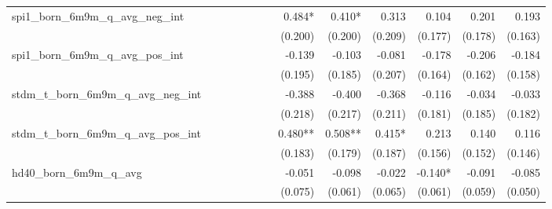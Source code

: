 \begin{tabular}{lrrrrrrrrrrrr}
spi1\_born\_6m9m\_q\_avg\_neg\_int          &              &              &              &              &              &              &       0.484* &       0.410* &        0.313 &        0.104 &        0.201 &        0.193 \\ 
                                            &              &              &              &              &              &              &      (0.200) &      (0.200) &      (0.209) &      (0.177) &      (0.178) &      (0.163) \\ 
spi1\_born\_6m9m\_q\_avg\_pos\_int          &              &              &              &              &              &              &       -0.139 &       -0.103 &       -0.081 &       -0.178 &       -0.206 &       -0.184 \\ 
                                            &              &              &              &              &              &              &      (0.195) &      (0.185) &      (0.207) &      (0.164) &      (0.162) &      (0.158) \\ 
stdm\_t\_born\_6m9m\_q\_avg\_neg\_int       &              &              &              &              &              &              &       -0.388 &       -0.400 &       -0.368 &       -0.116 &       -0.034 &       -0.033 \\ 
                                            &              &              &              &              &              &              &      (0.218) &      (0.217) &      (0.211) &      (0.181) &      (0.185) &      (0.182) \\ 
stdm\_t\_born\_6m9m\_q\_avg\_pos\_int       &              &              &              &              &              &              &      0.480** &      0.508** &       0.415* &        0.213 &        0.140 &        0.116 \\ 
                                            &              &              &              &              &              &              &      (0.183) &      (0.179) &      (0.187) &      (0.156) &      (0.152) &      (0.146) \\ 
hd40\_born\_6m9m\_q\_avg                    &              &              &              &              &              &              &       -0.051 &       -0.098 &       -0.022 &      -0.140* &       -0.091 &       -0.085 \\ 
                                            &              &              &              &              &              &              &      (0.075) &      (0.061) &      (0.065) &      (0.061) &      (0.059) &      (0.050) \\ 

\end{tabular}
